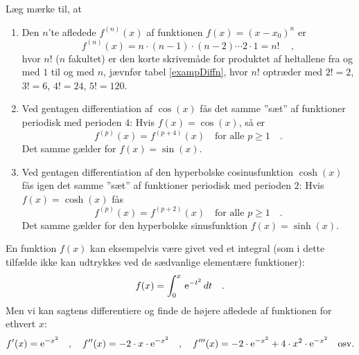 \begin{aha}
Læg mærke til, at
\begin{enumerate}
\item Den $n$'te afledede $f^{(n)}(x)$ af funktionen $f(x) = (x-x_{0})^{n}$ er
\begin{equation}
f^{(n)}(x) = n\cdot(n-1)\cdot(n-2) \cdots 2\cdot 1 = n!\, \quad ,
\end{equation}
hvor $n!$ ($n$ fakultet) er den korte skrivemåde for produktet af heltallene fra og med $1$ til og med $n$, jævnfør tabel \ref{exampDiffn}, hvor $n!$ optræder med $2! =2$, $3! =6$, $4! =24$, $5! =120$.
\item Ved gentagen differentiation af $\cos(x)$ fås det  samme ''sæt'' af funktioner periodisk med perioden $4$: Hvis $f(x) = \cos(x)$, så er
\begin{equation}
f^{(p)}(x) = f^{(p+4)}(x) \quad \textrm{for alle $p \geq 1$} \quad .
\end{equation}
Det samme gælder for $f(x) = \sin(x)$.
\item Ved gentagen differentiation af den hyperbolske cosinusfunktion $\cosh(x)$ fås igen det samme ''sæt'' af funktioner periodisk med perioden $2$: Hvis $f(x) = \cosh(x)$ fås
\begin{equation}
f^{(p)}(x) = f^{(p+2)}(x) \quad \textrm{for alle $p \geq 1$} \quad .
\end{equation}
Det samme gælder for den hyperbolske sinusfunktion $f(x) = \sinh(x)$.
\end{enumerate}
\end{aha}

\begin{example} \label{exampElemInt}
En funktion $f(x)$ kan eksempelvis være givet ved et integral (som i dette tilfælde ikke kan udtrykkes ved de sædvanlige elementære funktioner):
\begin{equation}
f(x) = \int_{0}^{x}\, \mathrm{e}^{-t^{2}}\, dt \quad .
\end{equation}
Men vi kan sagtens differentiere og finde de højere afledede af funktionen for ethvert $x$:
\begin{equation}
f'(x) = \mathrm{e}^{-x^{2}}\quad , \quad f''(x)= -2\cdot x \cdot \mathrm{e}^{-x^{2}}\quad , \quad f'''(x) =  -2 \cdot \mathrm{e}^{-x^{2}} + 4\cdot x^{2}\cdot\mathrm{e}^{-x^{2}}  \quad  \textrm{osv.}
\end{equation}
\end{example}

